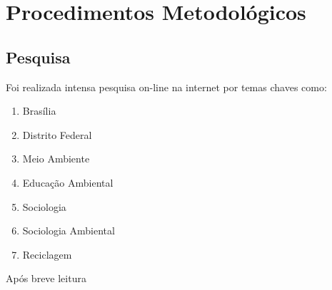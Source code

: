 \chapter{Procedimentos Metodológicos}

\section{Pesquisa}

Foi realizada intensa pesquisa on-line na internet por temas chaves como:
\begin{enumerate}
    \item Brasília
    \item Distrito Federal
    \item Meio Ambiente
    \item Educação Ambiental
    \item Sociologia
    \item Sociologia Ambiental
    \item Reciclagem
\end{enumerate}

Após breve leitura